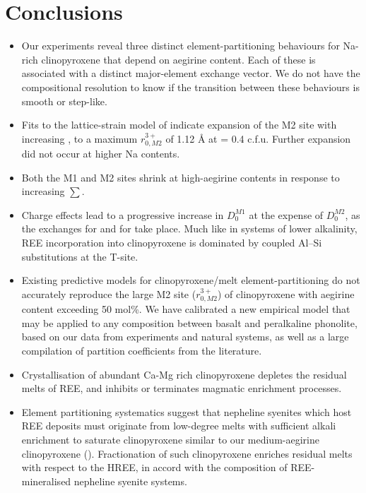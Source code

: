 \documentclass[final,authoryear,3p,times,twocolumn]{elsarticle}
\begin{document}
\section*{Conclusions}
\begin{itemize}
  \item Our experiments reveal three distinct element-partitioning behaviours for Na-rich clinopyroxene that depend on aegirine content. Each of these is associated with a distinct major-element exchange vector. We do not have the compositional resolution to know if the transition between these behaviours is smooth or step-like.
  
  \item Fits to the lattice-strain model of \citet{Blundy1994} indicate expansion of the M2 site with increasing , to a maximum $r_{0, M2}^{3+}$ of 1.12 \si{\angstrom}{}  at  = 0.4 c.f.u. Further expansion did not occur at higher Na contents.
  
  \item Both the M1  and M2 sites shrink at high-aegirine contents in response to increasing $\sum$.
  
  \item Charge effects lead to a progressive increase in $D_0^{M1}$ at the expense of $D_0^{M2}$, as the exchanges  for  and  for  take place. Much like in systems of lower alkalinity, REE incorporation into clinopyroxene is dominated by coupled Al--Si substitutions at the T-site.
  
  \item Existing predictive models for clinopyroxene/melt element-partitioning do not accurately reproduce the large M2 site ($r_{0,M2}^{3+}$) of clinopyroxene with aegirine content exceeding 50 mol\%. We have calibrated a new empirical model that may be applied to any composition between basalt and peralkaline phonolite, based on our data from experiments and natural systems, as well as a large compilation of partition coefficients from the literature.
  
  \item Crystallisation of abundant Ca-Mg rich clinopyroxene depletes the residual melts of REE, and inhibits or terminates magmatic enrichment processes.

  \item Element partitioning systematics suggest that nepheline syenites which host REE deposits must originate from low-degree melts with sufficient alkali enrichment to saturate clinopyroxene similar to our medium-aegirine clinopyroxene (). Fractionation of such clinopyroxene enriches residual melts with respect to the HREE, in accord with the composition of REE-mineralised nepheline syenite systems.
  
  \end{itemize}
\end{document}
